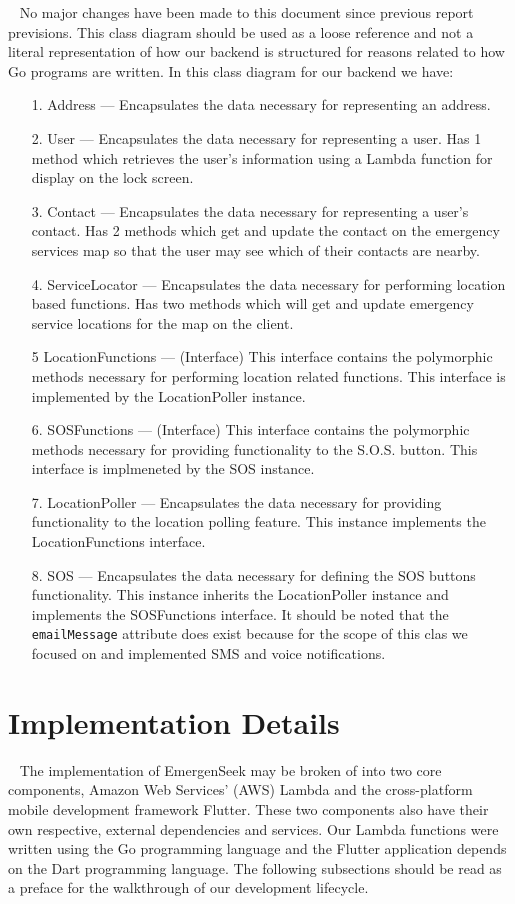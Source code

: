 \documentclass[10pt, a4paper]{article}
\begin{document}
\par ~ No major changes have been made to this document since previous report previsions. This class diagram should be used as a loose reference and not a literal representation of how our backend is structured for reasons related to how Go programs are written. In this class diagram for our backend we have:
\begin{enumerate}
	\item[1.] Address --- Encapsulates the data necessary for representing an address.
	\item[2.] User --- Encapsulates the data necessary for representing a user. Has 1 method which retrieves the user's information using a Lambda function for display on the lock screen.
	\item[3.] Contact --- Encapsulates the data necessary for representing a user's contact. Has 2 methods which get and update the contact on the emergency services map so that the user may see which of their contacts are nearby.
	\item[4.] ServiceLocator --- Encapsulates the data necessary for performing location based functions. Has two methods which will get and update emergency service locations for the map on the client.
	\item[5] LocationFunctions --- (Interface) This interface contains the polymorphic methods necessary for performing location related functions. This interface is implemented by the LocationPoller instance.
	\item[6.] SOSFunctions --- (Interface) This interface contains the polymorphic methods necessary for providing functionality to the S.O.S. button. This interface is implmeneted by the SOS instance.
	\item[7.] LocationPoller --- Encapsulates the data necessary for providing functionality to the location polling feature. This instance implements the LocationFunctions interface.
	\item[8.] SOS --- Encapsulates the data necessary for defining the SOS buttons functionality. This instance inherits the LocationPoller instance and implements the SOSFunctions interface. It should be noted that the \texttt{emailMessage} attribute does exist because for the scope of this clas we focused on and implemented SMS and voice notifications.
\end{enumerate}

\section{Implementation Details}
\par ~ The implementation of EmergenSeek may be broken of into two core components, Amazon Web Services' (AWS) Lambda and the cross-platform mobile development framework Flutter. These two components also have their own respective, external dependencies and services. Our Lambda functions were written using the Go programming language and the Flutter application depends on the Dart programming language. The following subsections should be read as a preface for the walkthrough of our development lifecycle. 
\end{document}
